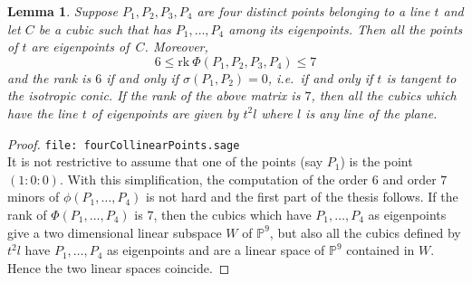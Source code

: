 \documentclass{amsart}
\theoremstyle{plain}
\newtheorem{lemma}{Lemma}[section]
\theoremstyle{definition}
\newcommand{\p}{\mathbb{P}}
\newcommand{\rk}{\ensuremath{\mathrm{rk}}}
\begin{document}
\begin{lemma}
\label{4ptiSuRetta2}
Suppose $P_1, P_2, P_3, P_4$ are four distinct points belonging to a line $t$
and let
$C$ be a cubic such that has $P_1, \dots, P_4$ among its eigenpoints. Then
all the points of $t$ are eigenpoints of~$C$. Moreover,
\begin{equation*}
6 \leq \rk  \  \Phi(P_1, P_2, P_3, P_4) \leq 7
\end{equation*}
and the rank is $6$ if and only if $\sigma(P_1, P_2) = 0$, i.e.\ if
and only if $t$ is tangent to the isotropic conic. If the rank of
the above matrix is $7$, then all the cubics which have the line $t$
of eigenpoints are given by $t^2l$ where $l$ is any line of the plane.
\end{lemma}
\begin{proof}
\verb+file: fourCollinearPoints.sage+\\
It is not restrictive to assume that one of the points (say $P_1$) is
the point $(1: 0: 0)$.
With this simplification, the computation of the order $6$ and order $7$
minors of $\phi(P_1, \dots, P_4)$ is not hard and
the first part of the thesis follows. If the rank of $\Phi(P_1, \dots, P_4)$
is $7$, then the cubics which have $P_1, \dots, P_4$ as eigenpoints
give a two dimensional linear subspace $W$ of $\p^9$, but also all
the cubics defined by $t^2l$ have $P_1, \dots, P_4$ as eigenpoints and are
a linear space of $\p^9$ contained in $W$. Hence the two linear
spaces coincide.
\end{proof}
\end{document}
